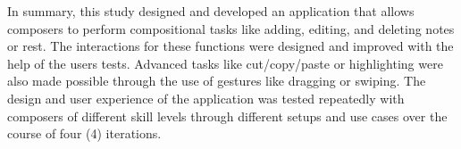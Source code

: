 		In summary, this study designed and developed an application that allows composers to perform compositional tasks like adding, editing, and deleting notes or rest. The interactions for these functions were designed and improved with the help of the users tests. Advanced tasks like cut/copy/paste or highlighting were also made possible through the use of gestures like dragging or swiping. The design and user experience of the application was tested repeatedly with composers of different skill levels through different setups and use cases over the course of four (4) iterations. 

		\begin{comment}
		This study provides a framework for designing mobile musical composition applications. This was done through user research which included performing interviews with composers and observing their creative processes. The results of the user research led to the design and development of a usable mobile musical composition tool. This was improved and redesigned repetitively over the course of several iterations. The average score of all features started at 2.6 in iteration 1. There was a huge growth in iteration 2 with the average jumping to 3.4 and was followed by a slight increase to 3.5 in iteration 3. The average scored slightly decreased to 3.2 in the last iteration which was expected since majority of the testers were experts. 

		Each iteration involved testing with composers and gathering quantitative and qualitative feedback, analyzing the results, and improving the application for the next iteration. Iteration 1 and 2 had the same five (5) testers, made up of four (4) amateurs and one (1) expert. Iteration 3 had the most number of testers, having nine (9) amateurs and six (6) experts, for a total of fifteen (15) testers. Iteration 4 had three (3) amateurs and eight (8) experts totaling to eleven (11) testers, making it the iteration with the most number of experts. 

		In iteration 1, only the core features (selecting, adding, editing, and deleting) were made available. Iteration 2 improved on the interaction of editing and deleting as well as added a lot of new features like changing the time and key signature, accidentals, transposition, cut/copy/paste, and music playback. Iteration 3 gave a new interaction for the low-rated accidentals in iteration 2, redesigned the time and key signature menu, added a new pop-up menu for transposition as well as other modifiers like slurs and retrograde-inversion, and a whole new bottom menu containing modifiers like dots, ottava, and a button to show/hide the keyboard. Iteration 4 allowed input from the keyboard, improved on the playback by also showing the current note/rest being played, allowed starting the playback from the measure where the cursor is at, and moved the top menu to the bottom area of the screen.


\end{comment}
